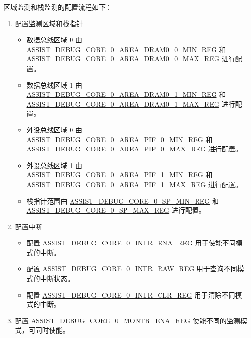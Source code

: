 \documentclass[main\_\_CN.tex]{subfiles}
\begin{document}
区域监测和栈监测的配置流程如下：
\begin{enumerate}
    \item 配置监测区域和栈指针
        \begin{itemize}
            \item 数据总线区域 0 由 \hyperref[regdesc:ASSISTDEBUGCORE0AREADRAM00MINREG]{ASSIST\_DEBUG\_CORE\_0\_AREA\_DRAM0\_0\_MIN\_REG} 和\\ \hyperref[regdesc:ASSISTDEBUGCORE0AREADRAM00MAXREG]{ASSIST\_DEBUG\_CORE\_0\_AREA\_DRAM0\_0\_MAX\_REG} 进行配置。
            \item 数据总线区域 1 由 \hyperref[regdesc:ASSISTDEBUGCORE0AREADRAM01MINREG]{ASSIST\_DEBUG\_CORE\_0\_AREA\_DRAM0\_1\_MIN\_REG} 和\\ \hyperref[regdesc:ASSISTDEBUGCORE0AREADRAM01MAXREG]{ASSIST\_DEBUG\_CORE\_0\_AREA\_DRAM0\_1\_MAX\_REG} 进行配置。
            \item 外设总线区域 0 由 \hyperref[regdesc:ASSISTDEBUGCORE0AREAPIF0MINREG]{ASSIST\_DEBUG\_CORE\_0\_AREA\_PIF\_0\_MIN\_REG} 和\\ \hyperref[regdesc:ASSISTDEBUGCORE0AREAPIF0MAXREG]{ASSIST\_DEBUG\_CORE\_0\_AREA\_PIF\_0\_MAX\_REG} 进行配置。
            \item 外设总线区域 1 由 \hyperref[regdesc:ASSISTDEBUGCORE0AREAPIF1MINREG]{ASSIST\_DEBUG\_CORE\_0\_AREA\_PIF\_1\_MIN\_REG} 和\\ \hyperref[regdesc:ASSISTDEBUGCORE0AREAPIF1MAXREG]{ASSIST\_DEBUG\_CORE\_0\_AREA\_PIF\_1\_MAX\_REG} 进行配置。
            \item 栈指针范围由 \hyperref[regdesc:ASSISTDEBUGCORE0SPMINREG]{ASSIST\_DEBUG\_CORE\_0\_SP\_MIN\_REG} 和\\ \hyperref[regdesc:ASSISTDEBUGCORE0SPMAXREG]{ASSIST\_DEBUG\_CORE\_0\_SP\_MAX\_REG} 进行配置。
        \end{itemize}
    \item 配置中断
    \begin{itemize}
        \item 配置 \hyperref[regdesc:ASSISTDEBUGCORE0INTRENAREG]{ASSIST\_DEBUG\_CORE\_0\_INTR\_ENA\_REG} 用于使能不同模式的中断。
        \item 配置 \hyperref[regdesc:ASSISTDEBUGCORE0INTRRAWREG]{ASSIST\_DEBUG\_CORE\_0\_INTR\_RAW\_REG} 用于查询不同模式的中断状态。
        \item 配置 \hyperref[regdesc:ASSISTDEBUGCORE0INTRCLRREG]{ASSIST\_DEBUG\_CORE\_0\_INTR\_CLR\_REG} 用于清除不同模式的中断。
        \end{itemize}
    \item 配置 \hyperref[regdesc:ASSISTDEBUGCORE0MONTRENAREG]{ASSIST\_DEBUG\_CORE\_0\_MONTR\_ENA\_REG} 使能不同的监测模式，可同时使能。
\end{enumerate}
\end{document}
